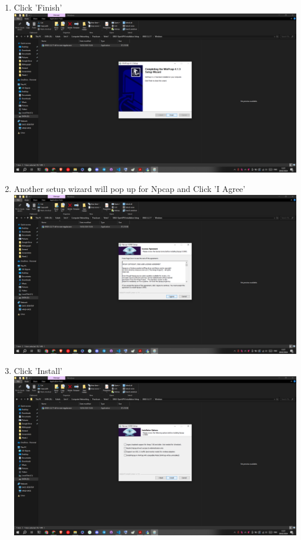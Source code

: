 \documentclass[12pt,titlepage]{article}
\begin{document}
\begin{enumerate}
    \item Click 'Finish' \\ \includegraphics[width=.9\textwidth]{images/figures/Screenshot (432).png}
    \newpage
    \item Another setup wizard will pop up for Npcap and Click 'I Agree' \\ \includegraphics[width=.9\textwidth]{images/figures/Screenshot (433).png}
    \item Click 'Install' \\ \includegraphics[width=.9\textwidth]{images/figures/Screenshot (434).png}
    \newpage

\end{enumerate}
\end{document}
